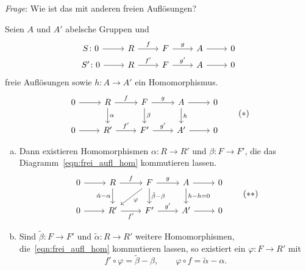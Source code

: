 \emph{Frage}: Wie ist das mit anderen freien Auflösungen?
\begin{lemma}
  Seien $A$ und $A'$ abelsche Gruppen und
  \begin{equation*}
    \begin{tikzcd}[row sep=tiny]
      S\colon 0  \arrow{r}{}  & R \arrow{r}{f}  & F \arrow{r}{g}  & A \arrow{r}{} & 0 \\
      S'\colon 0 \arrow{r}{}  & R \arrow{r}{f'} & F \arrow{r}{g'} & A \arrow{r}{} & 0
    \end{tikzcd}
  \end{equation*}
  freie Auflösungen sowie $h\colon A \to A'$ ein Homomorphismus.
  \begin{equation*}
    \begin{tikzcd}
      0 \arrow{r}{} & R   \arrow{d}{\alpha}
                          \arrow{r}{f}  & F   \arrow{d}{\beta}
                                              \arrow{r}{g}  & A   \arrow{d}{h}
                                                                  \arrow{r}{} & 0 \\
      0 \arrow{r}{} & R'  \arrow{r}{f'} & F'  \arrow{r}{g'} & A'  \arrow{r}{} & 0 
    \end{tikzcd}
    \tag{$*$}\label{eqn:frei_aufl_hom}
  \end{equation*}
  \begin{enumerate}[(a)]
    \item 
      Dann existieren Homomorphismen $\alpha \colon R \to R'$ und $\beta \colon F \to F'$, die das Diagramm~\eqref{eqn:frei_aufl_hom} kommutieren lassen.
      \begin{equation*}
        \begin{tikzcd}
      0 \arrow{r}{} & R   \arrow[swap]{d}{\tilde\alpha - \alpha}
                          \arrow{r}{f}  & F   \arrow{d}{\tilde\beta - \beta}
                                              \arrow{dl}{\varphi}
                                              \arrow{r}{g}  & A   \arrow{d}{h-h = 0}
                                                                  \arrow{r}{} & 0 \\
      0 \arrow{r}{} & R'  \arrow[swap]{r}{f'} & F'  \arrow{r}{g'} & A'  \arrow{r}{} & 0 
        \end{tikzcd}
        \tag{$**$}\label{eqn:frei_aufl_homotopie}
      \end{equation*}
    \item
      Sind $\tilde\beta \colon F \to F'$ und $\tilde\alpha \colon R \to R'$ weitere Homomorphismen, die~\eqref{eqn:frei_aufl_hom} kommutieren lassen, so existiert ein $\varphi \colon F \to R'$ mit
      \begin{equation*}
        f' \circ \varphi = \tilde\beta - \beta, \qquad \varphi \circ f = \tilde\alpha - \alpha.
      \end{equation*}
  \end{enumerate}
\end{lemma}
